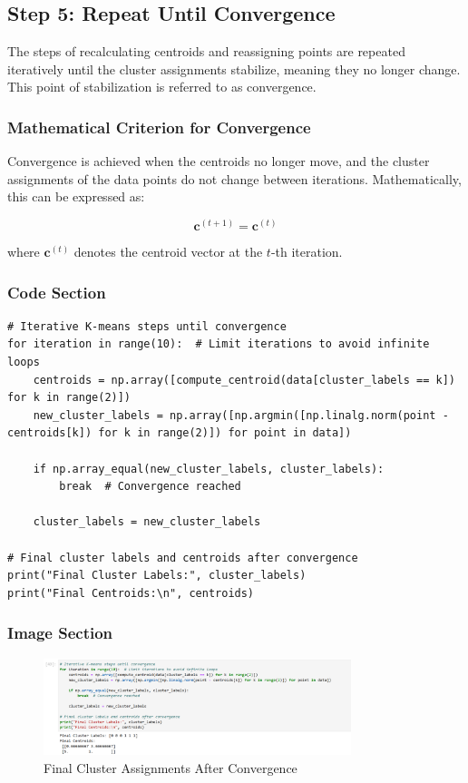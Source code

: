 \documentclass{exam}
\begin{document}
\subsection{Step 5: Repeat Until Convergence}

The steps of recalculating centroids and reassigning points are repeated iteratively until the cluster assignments stabilize, meaning they no longer change. This point of stabilization is referred to as convergence.

\subsubsection*{Mathematical Criterion for Convergence}
Convergence is achieved when the centroids no longer move, and the cluster assignments of the data points do not change between iterations. Mathematically, this can be expressed as:

\[
\mathbf{c}^{(t+1)} = \mathbf{c}^{(t)}
\]

where \( \mathbf{c}^{(t)} \) denotes the centroid vector at the \( t \)-th iteration.

\subsubsection*{Code Section}

\begin{verbatim}
# Iterative K-means steps until convergence
for iteration in range(10):  # Limit iterations to avoid infinite loops
    centroids = np.array([compute_centroid(data[cluster_labels == k]) for k in range(2)])
    new_cluster_labels = np.array([np.argmin([np.linalg.norm(point - centroids[k]) for k in range(2)]) for point in data])
    
    if np.array_equal(new_cluster_labels, cluster_labels):
        break  # Convergence reached
    
    cluster_labels = new_cluster_labels

# Final cluster labels and centroids after convergence
print("Final Cluster Labels:", cluster_labels)
print("Final Centroids:\n", centroids)
\end{verbatim}

\subsubsection*{Image Section}

\begin{figure}[h!]
    \centering
    \includegraphics[width=0.8\textwidth]{images/final_cluster_value.png}
    \caption{Final Cluster Assignments After Convergence}
    \label{fig:final_clusters}
\end{figure}
\end{document}
